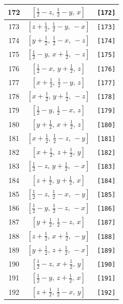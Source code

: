 \documentclass[fleqn,8pt]{jsarticle}
\begin{document}
\begin{longtable}{ccc}
172 & $\left[ \frac{1}{2} - z,\, \frac{1}{2} - y,\, x \right]$ & {\tt [172]} \\ \hline
173 & $\left[ z + \frac{1}{2},\, \frac{1}{2} - y,\, - x \right]$ & {\tt [173]} \\ \hline
174 & $\left[ y + \frac{1}{2},\, \frac{1}{2} - x,\, - z \right]$ & {\tt [174]} \\ \hline
175 & $\left[ \frac{1}{2} - y,\, x + \frac{1}{2},\, - z \right]$ & {\tt [175]} \\ \hline
176 & $\left[ \frac{1}{2} - x,\, y + \frac{1}{2},\, z \right]$ & {\tt [176]} \\ \hline
177 & $\left[ x + \frac{1}{2},\, \frac{1}{2} - y,\, z \right]$ & {\tt [177]} \\ \hline
178 & $\left[ x + \frac{1}{2},\, y + \frac{1}{2},\, - z \right]$ & {\tt [178]} \\ \hline
179 & $\left[ \frac{1}{2} - y,\, \frac{1}{2} - x,\, z \right]$ & {\tt [179]} \\ \hline
180 & $\left[ y + \frac{1}{2},\, x + \frac{1}{2},\, z \right]$ & {\tt [180]} \\ \hline
181 & $\left[ x + \frac{1}{2},\, \frac{1}{2} - z,\, - y \right]$ & {\tt [181]} \\ \hline
182 & $\left[ x + \frac{1}{2},\, z + \frac{1}{2},\, y \right]$ & {\tt [182]} \\ \hline
183 & $\left[ \frac{1}{2} - z,\, y + \frac{1}{2},\, - x \right]$ & {\tt [183]} \\ \hline
184 & $\left[ z + \frac{1}{2},\, y + \frac{1}{2},\, x \right]$ & {\tt [184]} \\ \hline
185 & $\left[ \frac{1}{2} - z,\, \frac{1}{2} - x,\, - y \right]$ & {\tt [185]} \\ \hline
186 & $\left[ \frac{1}{2} - y,\, \frac{1}{2} - z,\, - x \right]$ & {\tt [186]} \\ \hline
187 & $\left[ y + \frac{1}{2},\, \frac{1}{2} - z,\, x \right]$ & {\tt [187]} \\ \hline
188 & $\left[ z + \frac{1}{2},\, x + \frac{1}{2},\, - y \right]$ & {\tt [188]} \\ \hline
189 & $\left[ y + \frac{1}{2},\, z + \frac{1}{2},\, - x \right]$ & {\tt [189]} \\ \hline
190 & $\left[ \frac{1}{2} - z,\, x + \frac{1}{2},\, y \right]$ & {\tt [190]} \\ \hline
191 & $\left[ \frac{1}{2} - y,\, z + \frac{1}{2},\, x \right]$ & {\tt [191]} \\ \hline
192 & $\left[ z + \frac{1}{2},\, \frac{1}{2} - x,\, y \right]$ & {\tt [192]} \\ \hline

\end{longtable}
\end{document}
